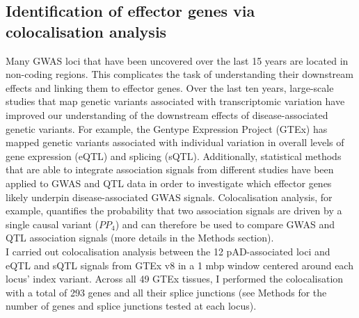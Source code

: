 \subsection{Identification of effector genes via colocalisation analysis} \label{sec:coloc}
Many GWAS loci that have been uncovered over the last 15 years are located in non-coding regions. This complicates the task of understanding their downstream effects and linking them to effector genes. Over the last ten years, large-scale studies that map genetic variants associated with transcriptomic variation have improved our understanding of the downstream effects of disease-associated genetic variants. For example, the Gentype Expression Project (GTEx) has mapped genetic variants associated with individual variation in overall levels of gene expression (eQTL) and splicing (sQTL). Additionally, statistical methods that are able to integrate association signals from different studies have been applied to GWAS and QTL data in order to investigate which effector genes likely underpin disease-associated GWAS signals. Colocalisation analysis, for example, quantifies the probability that two association signals are driven by a single causal variant ($PP_{4}$) and can therefore be used to compare GWAS and QTL association signals (more details in the Methods section).\\

I carried out colocalisation analysis between the 12 pAD-associated loci and eQTL and sQTL signals from GTEx v8 in a 1 mbp window centered around each locus' index variant. Across all 49 GTEx tissues, I performed the colocalisation with a total of 293 genes and all their splice junctions (see Methods for the number of genes and splice junctions tested at each locus).\\


